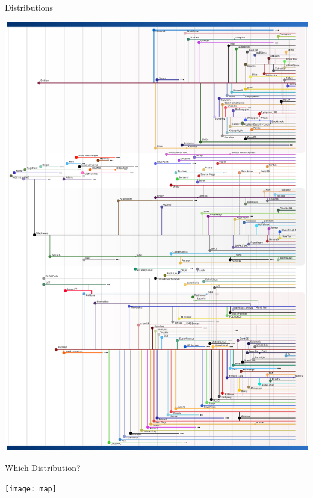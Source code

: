 \begin{frame}{Distributions}
  \begin{center}
    \includegraphics[height=.9\textheight]{Gldt}
  \end{center}
\end{frame}

\begin{frame}{Which Distribution?}
  \begin{center}
    \texttt{[image: map]}
  \end{center}
\end{frame}




